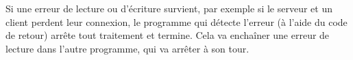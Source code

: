 \documentclass[letterpaper,12pt]{scrartcl}
\begin{document}
	Si une erreur de lecture ou d'écriture survient, par exemple si le serveur et un client perdent leur connexion, le programme qui détecte l'erreur (à l'aide du code de retour) arrête tout traitement et termine. Cela va enchaîner une erreur de lecture dans l'autre programme, qui va arrêter à son tour.
\end{document}
